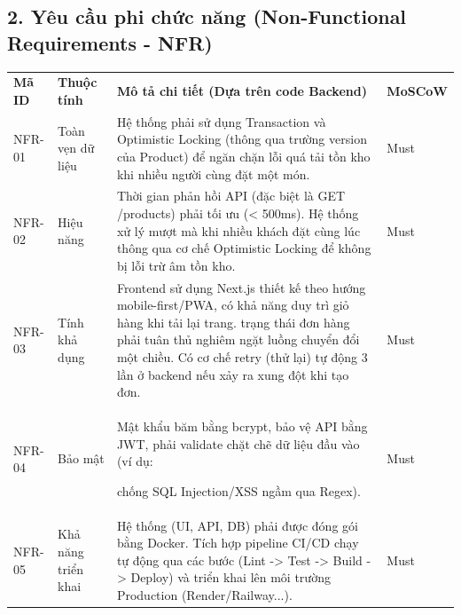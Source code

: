 \documentclass[
]{article}
\begin{document}
\subsection{}\label{section}

\subsection{2. Yêu cầu phi chức năng (Non-Functional Requirements - NFR)}\label{yuxeau-cux1ea7u-phi-chux1ee9c-nux103ng-non-functional-requirements---nfr}

\begin{longtable}[]{@{}
  >{\raggedright\arraybackslash}p{}
  >{\raggedright\arraybackslash}p{}
  >{\raggedright\arraybackslash}p{}
  >{\raggedright\arraybackslash}p{}@{}}
\toprule\noalign{}
\endhead
\bottomrule\noalign{}
\endlastfoot
\textbf{Mã ID} & \textbf{Thuộc tính} & \textbf{Mô tả chi tiết (Dựa trên code Backend)} & \textbf{MoSCoW} \\
NFR-01 & Toàn vẹn dữ liệu & Hệ thống phải sử dụng Transaction và Optimistic Locking (thông qua trường version của Product) để ngăn chặn lỗi quá tải tồn kho khi nhiều người cùng đặt một món. & Must \\
NFR-02 & Hiệu năng & Thời gian phản hồi API (đặc biệt là GET /products) phải tối ưu (\textless{} 500ms). Hệ thống xử lý mượt mà khi nhiều khách đặt cùng lúc thông qua cơ chế Optimistic Locking để không bị lỗi trừ âm tồn kho. & Must \\
NFR-03 & Tính khả dụng & Frontend sử dụng Next.js thiết kế theo hướng mobile-first/PWA, có khả năng duy trì giỏ hàng khi tải lại trang. trạng thái đơn hàng phải tuân thủ nghiêm ngặt luồng chuyển đổi một chiều. Có cơ chế retry (thử lại) tự động 3 lần ở backend nếu xảy ra xung đột khi tạo đơn. & Must \\
NFR-04 & Bảo mật & Mật khẩu băm bằng bcrypt, bảo vệ API bằng JWT, phải validate chặt chẽ dữ liệu đầu vào (ví dụ:

chống SQL Injection/XSS ngầm qua Regex). & Must \\
NFR-05 & Khả năng triển khai & Hệ thống (UI, API, DB) phải được đóng gói bằng Docker. Tích hợp pipeline CI/CD chạy tự động qua các bước (Lint -\textgreater{} Test -\textgreater{} Build -\textgreater{} Deploy) và triển khai lên môi trường Production (Render/Railway...). & Must \\
\end{longtable}
\end{document}
